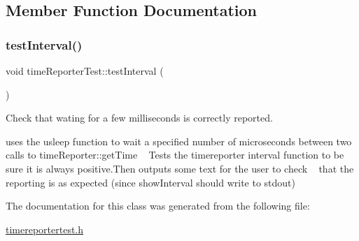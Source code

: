 \subsection{Member Function Documentation}
\mbox{\label{classtimeReporterTest_a4488d70ca37d086b82cce74e5c25a53d}} 
\subsubsection{\texorpdfstring{test\+Interval()}{testInterval()}}
{\footnotesize\ttfamily void time\+Reporter\+Test\+::test\+Interval (\begin{DoxyParamCaption}{ }\end{DoxyParamCaption})\hspace{0.3cm}{\ttfamily [inline]}}



Check that wating for a few milliseconds is correctly reported. 

uses the usleep function to wait a specified number of microseconds between two calls to time\+Reporter\+::get\+Time ~\newline
Tests the timereporter interval function to be sure it is always positive.\+Then outputs some text for the user to check ~\newline
that the reporting is as expected (since show\+Interval should write to stdout) 

The documentation for this class was generated from the following file\+:\begin{DoxyCompactItemize}
\item 
\mbox{\hyperlink{timereportertest_8h}{timereportertest.\+h}}\end{DoxyCompactItemize}
